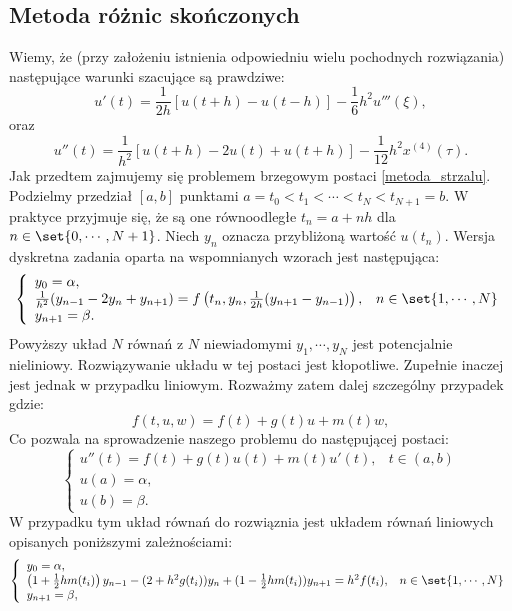 \subsection{Metoda różnic skończonych} \label{subsection-boundary-theory-finite-differences}
Wiemy, że (przy założeniu istnienia odpowiedniu wielu pochodnych rozwiązania) następujące warunki szacujące są prawdziwe:
\begin{equation}
u'(t) = \frac{1}{2h}[u(t+h) - u(t-h)] - \frac{1}{6}h^2u'''(\xi),
\end{equation}
oraz 
\begin{equation}
u''(t) = \frac{1}{h^2}[u(t+h) - 2u(t) + u(t+h)] - \frac{1}{12}h^2x^{(4)}(\tau).
\end{equation}
Jak przedtem zajmujemy się problemem brzegowym postaci \eqref{metoda_strzalu}. Podzielmy przedział $[a,b]$ punktami $ a=t_0<t_1<\cdots<t_N<t_{N+1}=b $. W praktyce przyjmuje się, że są one równoodległe $t_n = a + nh$ dla $n \in \set{0,\cdots,N+1}$. Niech $y_n$ oznacza przybliżoną wartość $u(t_n)$. Wersja dyskretna zadania oparta na wspomnianych wzorach jest następująca:
$$
\left\{\begin{array}{ll}
y_0 = \alpha, & \\
\frac{1}{h^2}(y_{n-1}-2y_n + y_{n+1}) = f\left(t_n,y_n,\frac{1}{2h}(y_{n+1} - y_{n-1})\right),& n \in \set{1,\cdots,N} \\
y_{n+1} = \beta.
\end{array}\right. 
$$
Powyższy układ $N$ równań z $N$ niewiadomymi $y_1,\cdots,y_N$ jest potencjalnie nieliniowy. Rozwiązywanie układu w tej postaci jest kłopotliwe. Zupełnie inaczej jest jednak w przypadku liniowym. Rozważmy zatem dalej szczególny przypadek gdzie:
$$
f(t,u,w) =f(t) +  g(t) u + m(t) w,
$$
Co pozwala na sprowadzenie naszego problemu do następującej postaci:
\begin{equation}
\left\{\begin{array}{ll}
u''(t)=f(t) + g(t) u(t) + m(t) u'(t), & t \in (a,b) \\
u(a)= \alpha, & \\
u(b)= \beta.
\end{array}\right.
\end{equation}
W przypadku tym układ równań do rozwiąznia jest układem równań liniowych opisanych poniższymi zależnościami:
$$
\left\{\begin{array}{ll}
y_0 = \alpha, & \\
\left(1+ \frac{1}{2}h m(t_i)\right)y_{n-1} - (2+ h^2 g(t_i))y_n + (1- \frac{1}{2}h m(t_i))y_{n+1} = h^2 f(t_i) ,& n \in \set{1,\cdots,N} \\
y_{n+1} = \beta,
\end{array}\right. 
$$ 
